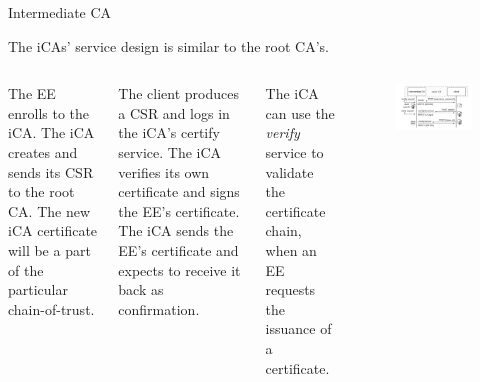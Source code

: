 \documentclass[10pt]{beamer}
\begin{document}
\begin{frame}[allowframebreaks]{Intermediate CA}
	
	The iCAs' service design is similar to the root CA's.
	
	\begin{columns}[T]	
		The EE enrolls to the iCA. The iCA creates and sends its CSR to the root CA. The new iCA certificate will be a part of the particular chain-of-trust.
		\hfill\break 
		
		The client produces a CSR and logs in the iCA's certify service. The iCA verifies its own certificate and signs the EE's certificate. The iCA sends the EE's certificate and expects to receive it back as confirmation.
		
		The iCA can use the \textit{verify} service to validate the certificate chain, when an EE requests the issuance of a certificate.
		
		\medskip 
		
		\begin{figure}
			\centering
			\includegraphics[width=\textwidth]{images/iCAclient.drawio.pdf}
		\end{figure}
		\smallskip
	\end{columns}
\end{frame}
\end{document}
